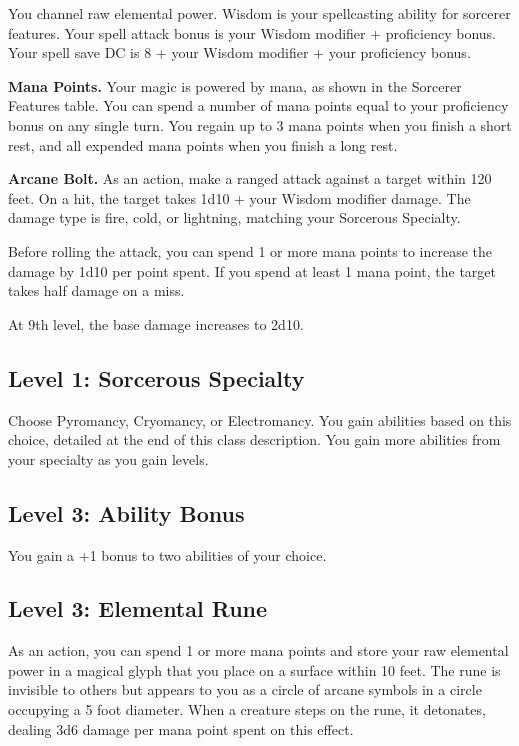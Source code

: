 \documentclass[12pt,letterpaper,twocolumn,openany,nodeprecatedcode,bg=none]{dndbook}
\let\oldsubsection\subsection
\renewcommand{\subsection}[1]{%
  \needspace{5\baselineskip}%
  \oldsubsection{#1}%
}
\begin{document}
You channel raw elemental power. Wisdom is your spellcasting ability for
sorcerer features. Your spell attack bonus is your Wisdom modifier +
proficiency bonus. Your spell save DC is 8 + your Wisdom modifier + your
proficiency bonus.

\textbf{Mana Points.} Your magic is powered by mana, as shown in the
Sorcerer Features table. You can spend a number of mana points equal to
your proficiency bonus on any single turn. You regain up to 3 mana
points when you finish a short rest, and all expended mana points when
you finish a long rest.

\textbf{Arcane Bolt.} As an action, make a ranged attack against a
target within 120 feet. On a hit, the target takes 1d10 + your Wisdom
modifier damage. The damage type is fire, cold, or lightning, matching
your Sorcerous Specialty.

Before rolling the attack, you can spend 1 or more mana points to
increase the damage by 1d10 per point spent. If you spend at least 1
mana point, the target takes half damage on a miss.

At 9th level, the base damage increases to 2d10.

\subsection{Level 1: Sorcerous
Specialty}\label{level-1-sorcerous-specialty}

Choose Pyromancy, Cryomancy, or Electromancy. You gain abilities based
on this choice, detailed at the end of this class description. You gain
more abilities from your specialty as you gain levels.

\subsection{Level 3: Ability Bonus}\label{level-3-ability-bonus}

You gain a +1 bonus to two abilities of your choice.

\subsection{Level 3: Elemental Rune}\label{level-3-elemental-rune}

As an action, you can spend 1 or more mana points and store your raw
elemental power in a magical glyph that you place on a surface within 10
feet. The rune is invisible to others but appears to you as a circle of
arcane symbols in a circle occupying a 5 foot diameter. When a creature
steps on the rune, it detonates, dealing 3d6 damage per mana point spent
on this effect.
\end{document}
